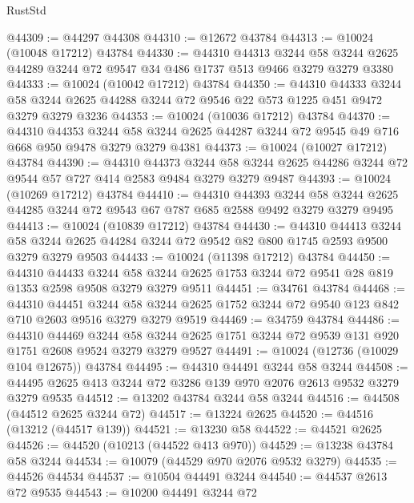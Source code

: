 \begin{lexlean}{RustStd}
\begin{coremodule}
@44309 := @44297 @44308
@44310 := @12672 @43784
@44313 := @10024 (@10048 @17212) @43784
@44330 := @44310
    @44313
    @3244
    @58
    @3244
    @2625
    @44289
    @3244
    @72
    @9547
    @34
    @486
    @1737
    @513
    @9466
    @3279
    @3279
    @3380
@44333 := @10024 (@10042 @17212) @43784
@44350 := @44310
    @44333
    @3244
    @58
    @3244
    @2625
    @44288
    @3244
    @72
    @9546
    @22
    @573
    @1225
    @451
    @9472
    @3279
    @3279
    @3236
@44353 := @10024 (@10036 @17212) @43784
@44370 := @44310
    @44353
    @3244
    @58
    @3244
    @2625
    @44287
    @3244
    @72
    @9545
    @49
    @716
    @668
    @950
    @9478
    @3279
    @3279
    @4381
@44373 := @10024 (@10027 @17212) @43784
@44390 := @44310
    @44373
    @3244
    @58
    @3244
    @2625
    @44286
    @3244
    @72
    @9544
    @57
    @727
    @414
    @2583
    @9484
    @3279
    @3279
    @9487
@44393 := @10024 (@10269 @17212) @43784
@44410 := @44310
    @44393
    @3244
    @58
    @3244
    @2625
    @44285
    @3244
    @72
    @9543
    @67
    @787
    @685
    @2588
    @9492
    @3279
    @3279
    @9495
@44413 := @10024 (@10839 @17212) @43784
@44430 := @44310
    @44413
    @3244
    @58
    @3244
    @2625
    @44284
    @3244
    @72
    @9542
    @82
    @800
    @1745
    @2593
    @9500
    @3279
    @3279
    @9503
@44433 := @10024 (@11398 @17212) @43784
@44450 := @44310
    @44433
    @3244
    @58
    @3244
    @2625
    @1753
    @3244
    @72
    @9541
    @28
    @819
    @1353
    @2598
    @9508
    @3279
    @3279
    @9511
@44451 := @34761 @43784
@44468 := @44310
    @44451
    @3244
    @58
    @3244
    @2625
    @1752
    @3244
    @72
    @9540
    @123
    @842
    @710
    @2603
    @9516
    @3279
    @3279
    @9519
@44469 := @34759 @43784
@44486 := @44310
    @44469
    @3244
    @58
    @3244
    @2625
    @1751
    @3244
    @72
    @9539
    @131
    @920
    @1751
    @2608
    @9524
    @3279
    @3279
    @9527
@44491 := @10024 (@12736 (@10029 @104 @12675)) @43784
@44495 := @44310 @44491 @3244 @58 @3244
@44508 := @44495 @2625 @413 @3244 @72 @3286 @139 @970 @2076 @2613 @9532 @3279 @3279 @9535
@44512 := @13202 @43784 @3244 @58 @3244
@44516 := @44508 (@44512 @2625 @3244 @72)
@44517 := @13224 @2625
@44520 := @44516 (@13212 (@44517 @139))
@44521 := @13230 @58
@44522 := @44521 @2625
@44526 := @44520 (@10213 (@44522 @413 @970))
@44529 := @13238 @43784 @58 @3244
@44534 := @10079 (@44529 @970 @2076 @9532 @3279)
@44535 := @44526 @44534
@44537 := @10504 @44491 @3244
@44540 := @44537 @2613 @72 @9535
@44543 := @10200 @44491 @3244 @72

\end{coremodule}
\end{lexlean}
